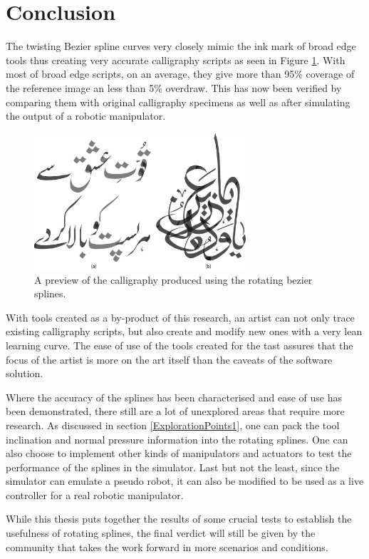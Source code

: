 \section{Conclusion}
\label{Chapter:Conclusion}
{
    The twisting Bezier spline curves very closely mimic the ink mark of broad edge tools thus creating very accurate calligraphy scripts as seen in Figure \ref{Image:spline_prev}. With most of broad edge scripts, on an average, they give more than 95\% coverage of the reference image an less than 5\% overdraw. This has now been verified by comparing them with original calligraphy specimens as well as after simulating the output of a robotic manipulator.

    \begin{figure}
      \centering
      \includegraphics[width=0.7\textwidth]{../Images/rotating bezier splines preview.pdf}
      \caption{A preview of the calligraphy produced using the rotating bezier splines.
      } \label{Image:spline_prev}
    \end{figure}

    With tools created as a by-product of this research, an artist can not only trace existing calligraphy scripts, but also create and modify new ones with a very lean learning curve. The ease of use of the tools created for the tast assures that the focus of the artist is more on the art itself than the caveats of the software solution.

    Where the accuracy of the splines has been characterised and ease of use has been demonstrated, there still are a lot of unexplored areas that require more research. As discussed in section \ref{ExplorationPoints1}, one can pack the tool inclination and normal pressure information into the rotating splines. One can also choose to implement other kinds of manipulators and actuators to test the performance of the splines in the simulator. Last but not the least, since the simulator can emulate a pseudo robot, it can also be modified to be used as a live controller for a real robotic manipulator.

    While this thesis puts together the results of some crucial tests to establish the usefulness of rotating splines, the final verdict will still be given by the community that takes the work forward in more scenarios and conditions.
}
\clearpage 